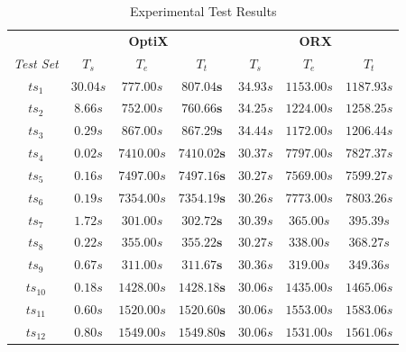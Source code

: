 \begin{table}[h]
    \centering
  \footnotesize
  \begin{tabular}{c|ccc|ccc}
    &  \multicolumn{3}{c|}{\textbf{\large{OptiX}}} & \multicolumn{3}{c}{\textbf{\large{ORX}}}\\
    \emph{Test Set} & \emph{$T_s$} & \emph{$T_e$} & \emph{$T_t$} & \emph{$T_s$} & \emph{$T_e$} & \emph{$T_t$}\\
    \hline
    $ts_{1}$   &   $30.04s$    &   $777.00s$     &   $\mathbf{807.04s}$     &   $34.93s$    &   $1153.00s$   &   $1187.93s$ \\
    $ts_{2}$   &   $8.66s$     &   $752.00s$     &   $\mathbf{760.66s}$     &   $34.25s$    &   $1224.00s$   &   $1258.25s$ \\
    $ts_{3}$   &   $0.29s$     &   $867.00s$     &   $\mathbf{867.29s}$     &   $34.44s$    &   $1172.00s$   &   $1206.44s$ \\
    \hline
    $ts_{4}$   &   $0.02s$     &   $7410.00s$    &   $\mathbf{7410.02s}$    &   $30.37s$    &   $7797.00s$   &   $7827.37s$ \\
    $ts_{5}$   &   $0.16s$     &   $7497.00s$    &   $\mathbf{7497.16s}$    &   $30.27s$    &   $7569.00s$   &   $7599.27s$ \\
    $ts_{6}$   &   $0.19s$     &   $7354.00s$    &   $\mathbf{7354.19s}$    &   $30.26s$    &   $7773.00s$   &   $7803.26s$ \\
    \hline
    $ts_{7}$   &   $1.72s$     &   $301.00s$     &   $\mathbf{302.72s}$     &   $30.39s$    &   $365.00s$    &   $395.39s$  \\
    $ts_{8}$   &   $0.22s$     &   $355.00s$     &   $\mathbf{355.22s}$     &   $30.27s$    &   $338.00s$    &   $368.27s$  \\
    $ts_{9}$   &   $0.67s$     &   $311.00s$     &   $\mathbf{311.67s}$     &   $30.36s$    &   $319.00s$    &   $349.36s$  \\
    \hline
    $ts_{10}$  &   $0.18s$     &   $1428.00s$    &   $\mathbf{1428.18s}$    &   $30.06s$    &   $1435.00s$   &   $1465.06s$ \\
    $ts_{11}$  &   $0.60s$     &   $1520.00s$    &   $\mathbf{1520.60s}$    &   $30.06s$    &   $1553.00s$   &   $1583.06s$ \\
    $ts_{12}$  &   $0.80s$     &   $1549.00s$    &   $\mathbf{1549.80s}$    &   $30.06s$    &   $1531.00s$   &   $1561.06s$\\
  \end{tabular}
  \caption{Experimental Test Results}
  \label{test_results}
\end{table}

